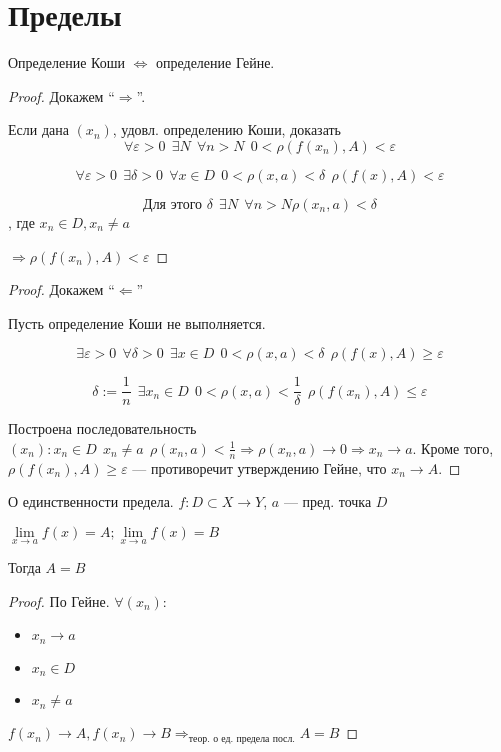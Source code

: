 

\cfoot{}



\section{Пределы}

\begin{theorem}
    Определение Коши $\Leftrightarrow$ определение Гейне.
\end{theorem}
\begin{proof}
    Докажем ``$\Rightarrow$''.

    Если дана $(x_n)$, удовл. определению Коши, доказать $$\forall \varepsilon>0 \ \ \exists N \ \ \forall n > N \ \ 0<\rho(f(x_n), A)<\varepsilon$$

    $$\forall \varepsilon>0 \ \ \exists \delta>0 \ \ \forall x \in D \ \ 0<\rho(x, a)<\delta \ \ \rho(f(x), A)<\varepsilon$$

    $$\text{Для этого } \delta \ \ \exists N \ \ \forall n>N \rho(x_n,a)<\delta$$, где $x_n\in D, x_n\not = a$

    $\Rightarrow \rho(f(x_n), A)<\varepsilon$
\end{proof}
\begin{proof}
    Докажем ``$\Leftarrow$''

    Пусть определение Коши не выполняется.

    $$\exists \varepsilon>0 \ \ \forall \delta>0 \ \ \exists x\in D \ \ 0<\rho(x,a)<\delta \ \ \rho(f(x), A)\geq \varepsilon$$

    $$\delta:=\frac{1}{n} \ \ \exists x_n\in D \ \ 0<\rho(x,a)<\frac{1}{\delta} \ \ \rho(f(x_n), A)\leq\varepsilon$$

    Построена последовательность $(x_n): x_n\in D \ \ x_n\not = a \ \ \rho(x_n, a)<\frac{1}{n} \Rightarrow \rho(x_n, a)\to 0 \Rightarrow x_n\to a$. Кроме того, $\rho(f(x_n), A)\geq \varepsilon$ --- противоречит утверждению Гейне, что $x_n\to A$.
\end{proof}

\begin{theorem}
    О единственности предела.
    $f: D\subset X\to Y$, $a$ --- пред. точка $D$

    $\lim\limits_{x\to a} f(x)=A; \lim\limits_{x\to a} f(x)=B$

    Тогда $A=B$
\end{theorem}
\begin{proof}
    По Гейне.
    $\forall (x_n):$
    \begin{itemize}
        \itemsep0em
        \item $x_n\to a$
        \item $x_n\in D$
        \item $x_n\not=a$
    \end{itemize}
    
    $f(x_n)\to A, f(x_n)\to B \Rightarrow_{\text{теор. о ед. предела посл.}} A=B$
\end{proof}

